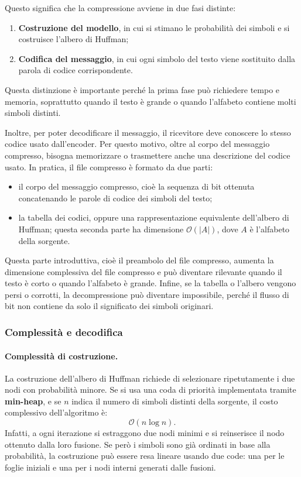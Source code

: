 \documentclass{article}
\theoremstyle{definition}
\numberwithin{equation}{section}
\begin{document}
Questo significa che la compressione avviene in due fasi distinte:
\begin{enumerate}
    \item \textbf{Costruzione del modello}, in cui si stimano le probabilità dei simboli e si costruisce l'albero di Huffman;
    \item \textbf{Codifica del messaggio}, in cui ogni simbolo del testo viene sostituito dalla parola di codice corrispondente.
\end{enumerate}
Questa distinzione è importante perché la prima fase può richiedere tempo e memoria, soprattutto quando il testo è grande o quando l'alfabeto contiene molti simboli distinti.

Inoltre, per poter decodificare il messaggio, il ricevitore deve conoscere lo stesso codice usato dall'encoder. Per questo motivo, oltre al corpo del messaggio compresso, bisogna memorizzare o trasmettere anche una descrizione del codice usato. In pratica, il file compresso è formato da due parti:
\begin{itemize}
    \item il corpo del messaggio compresso, cioè la sequenza di bit ottenuta concatenando le parole di codice dei simboli del testo;
    \item la tabella dei codici, oppure una rappresentazione equivalente dell'albero di Huffman; questa seconda parte ha dimensione $\mathcal{O}(|A|)$, dove $A$ è l'alfabeto della sorgente.
\end{itemize}
Questa parte introduttiva, cioè il preambolo del file compresso, aumenta la dimensione complessiva del file compresso e può diventare rilevante quando il testo è corto o quando l'alfabeto è grande. Infine, se la tabella o l'albero vengono persi o corrotti, la decompressione può diventare impossibile, perché il flusso di bit non contiene da solo il significato dei simboli originari.

\subsubsection{Complessità e decodifica}
\paragraph{Complessità di costruzione.}
La costruzione dell'albero di Huffman richiede di selezionare ripetutamente i due nodi con probabilità minore. Se si usa una coda di priorità implementata tramite \textbf{min-heap}, e se $n$ indica il numero di simboli distinti della sorgente, il costo complessivo dell'algoritmo è:
\[
    \mathcal{O}(n\log n).
\]
Infatti, a ogni iterazione si estraggono due nodi minimi e si reinserisce il nodo ottenuto dalla loro fusione. Se però i simboli sono già ordinati in base alla probabilità, la costruzione può essere resa lineare usando due code: una per le foglie iniziali e una per i nodi interni generati dalle fusioni.
\end{document}
